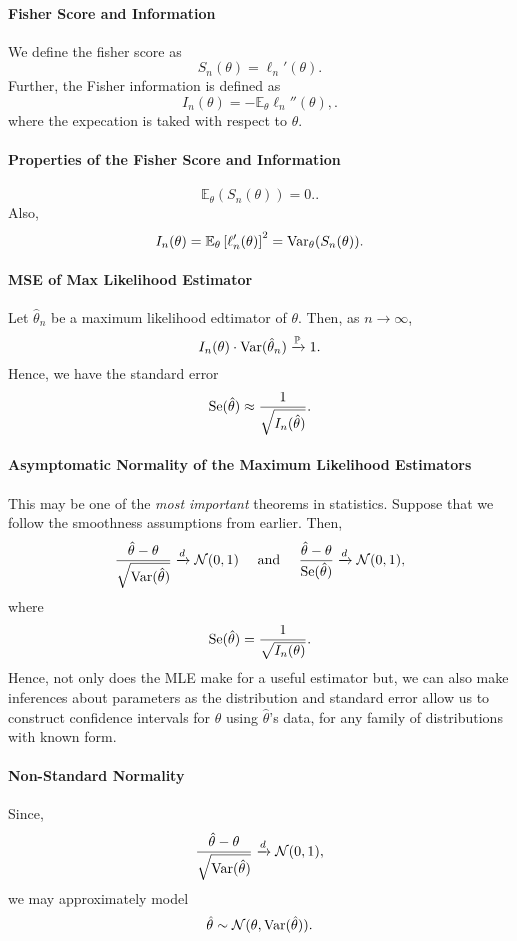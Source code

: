 \paragraph{Fisher Score and Information}
We define the fisher score as \[
  S_n(\theta) = \ell_n'(\theta)
.\]
Further, the Fisher information is defined as \[
  I_n(\theta) = - \mathbb{E}_\theta \ell_n'' (\theta),
.\] where the expecation is taked with respect to \(\theta\).

\paragraph{Properties of the Fisher Score and Information} \[
  \mathbb{E}_\theta \left( S_n(\theta) \right)  = 0.
.\] Also, \[
I_n(\theta) = \mathbb{E}_\theta \left[ \ell_n'(\theta) \right]^2 = \mathrm{Var}_\theta(S_n(\theta))
.\] 

\paragraph{MSE of Max Likelihood Estimator} Let \(\hat{\theta}_n\) be a maximum likelihood edtimator of
\(\theta\). Then, as \(n \to \infty\), \[
  I_n(\theta) \cdot \mathrm{Var}(\hat{\theta}_n) \xrightarrow{\mathbb{P}} 1
.\] 
Hence, we have the standard error \[
  \mathrm{Se}(\hat{\theta}) \approx \frac{1}{\sqrt{I_n (\hat{\theta})} }
.\] 

\paragraph{Asymptomatic Normality of the Maximum Likelihood Estimators}
This may be one of the \textit{most important} theorems in statistics. Suppose that
we follow the smoothness assumptions from earlier. Then, \[
  \frac{\hat{\theta} - \theta}{\sqrt{\mathrm{Var}(\hat{\theta})}} \xrightarrow{d} \mathcal{N}(0, 1)
  \quad \text{ and } \quad
  \frac{\hat{\theta} - \theta}{\mathrm{Se}(\hat{\theta})} \xrightarrow{d} \mathcal{N}(0, 1),
\] where \[
  \mathrm{Se}(\hat{\theta}) = \frac{1}{\sqrt{I_n(\theta)}}
.\] 
Hence, not only does the MLE make for a useful estimator but, we can also
make inferences about parameters as the distribution and standard error allow us to construct
confidence intervals for \(\theta\) using \(\hat{\theta}\)'s data, for any family
of distributions with known form.

\paragraph{Non-Standard Normality}
Since, \[
  \frac{\hat{\theta} - \theta}{\sqrt{\mathrm{Var}(\hat{\theta})}} \xrightarrow{d} \mathcal{N}(0, 1)
,\] we may approximately model \[
  \hat{\theta} \sim \mathcal{N}(\theta, \mathrm{Var}(\hat{\theta}))
.\] 

